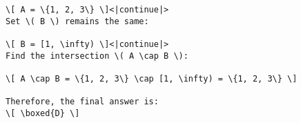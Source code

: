 \begin{tcolorbox}[gray_box, title = {{Synthetic Data Example Type III-I: Correct mistake}}]
\begin{verbatim}
\[ A = \{1, 2, 3\} \]<|continue|>
Set \( B \) remains the same:

\[ B = [1, \infty) \]<|continue|>
Find the intersection \( A \cap B \):

\[ A \cap B = \{1, 2, 3\} \cap [1, \infty) = \{1, 2, 3\} \]

Therefore, the final answer is:
\[ \boxed{D} \]

\end{verbatim}

\end{tcolorbox}